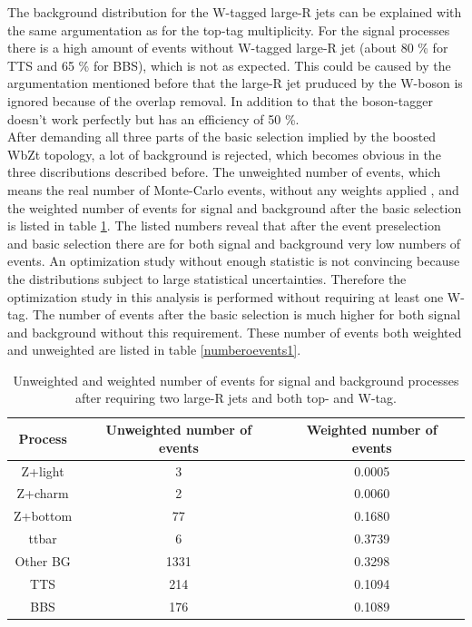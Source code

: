 The background distribution for the W-tagged large-R jets can be explained with the same argumentation as for the top-tag multiplicity.
For the signal processes there is a high amount of events without W-tagged large-R jet (about 80 \% for TTS and 65 \% for BBS), which is not as expected.
This could be caused by the argumentation mentioned before that the large-R jet pruduced by the W-boson is ignored because of the overlap removal.
In addition to that the boson-tagger doesn't work perfectly but has an efficiency of 50 \%.\\
After demanding all three parts of the basic selection implied by the boosted WbZt topology, a lot of background is rejected, which becomes obvious in the three discributions described before.
The unweighted number of events, which means the real number of Monte-Carlo events, without any weights applied , and the weighted number of events for signal and background after the basic selection is listed in table \ref{numberoevents}.
The listed numbers reveal that after the event preselection and basic selection there are for both signal and background very  low numbers of events.
An optimization study without enough statistic is not convincing because the distributions subject to large statistical uncertainties.
Therefore the optimization study in this analysis is performed without requiring at least one W-tag.
The number of events after the basic selection is much higher for both signal and background without this requirement.
These number of events both weighted and unweighted are listed in table \ref{numberoevents1}.

\begin{table}
\centering
\begin{tabular}{|c|c|c|} 
\hline
\textbf{Process} & \textbf{Unweighted number of events} & \textbf{Weighted number of events}  \\
\hline
\hline
Z+light & 3 & 0.0005\\
Z+charm & 2 & 0.0060\\
Z+bottom & 77 & 0.1680\\
ttbar{} & 6 & 0.3739\\
Other BG & 1331 & 0.3298\\
TTS & 214 & 0.1094\\
BBS & 176 & 0.1089\\
\hline
\end{tabular}
\caption{Unweighted and weighted number of events for signal and background processes after requiring two large-R jets and both top- and W-tag.}
\label{numberoevents}
\end{table}





